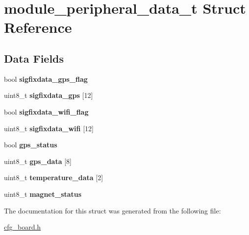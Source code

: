 \hypertarget{structmodule__peripheral__data__t}{}\section{module\+\_\+peripheral\+\_\+data\+\_\+t Struct Reference}
\label{structmodule__peripheral__data__t}
\subsection*{Data Fields}
\begin{DoxyCompactItemize}
\item 
\mbox{\label{structmodule__peripheral__data__t_a3425660ec4eae0d0f621812b5b8b065a}} 
bool {\bfseries sigfixdata\+\_\+gps\+\_\+flag}
\item 
\mbox{\label{structmodule__peripheral__data__t_a5dd41c3135b41097499085bfa013a365}} 
uint8\+\_\+t {\bfseries sigfixdata\+\_\+gps} \mbox{[}12\mbox{]}
\item 
\mbox{\label{structmodule__peripheral__data__t_a514358608c2643a4571ebd34dc815af7}} 
bool {\bfseries sigfixdata\+\_\+wifi\+\_\+flag}
\item 
\mbox{\label{structmodule__peripheral__data__t_a141f525edd62ed24b896899fc7cede75}} 
uint8\+\_\+t {\bfseries sigfixdata\+\_\+wifi} \mbox{[}12\mbox{]}
\item 
\mbox{\label{structmodule__peripheral__data__t_a00ec4412f388501d6f2e450c543758f5}} 
bool {\bfseries gps\+\_\+status}
\item 
\mbox{\label{structmodule__peripheral__data__t_a054359d88173d07a1ff2af5fe7bbda60}} 
uint8\+\_\+t {\bfseries gps\+\_\+data} \mbox{[}8\mbox{]}
\item 
\mbox{\label{structmodule__peripheral__data__t_a758a111e5668bd9125f515c133281af2}} 
uint8\+\_\+t {\bfseries temperature\+\_\+data} \mbox{[}2\mbox{]}
\item 
\mbox{\label{structmodule__peripheral__data__t_a6653b68abab6319750ac8d844273aad1}} 
uint8\+\_\+t {\bfseries magnet\+\_\+status}
\end{DoxyCompactItemize}


The documentation for this struct was generated from the following file\+:\begin{DoxyCompactItemize}
\item 
\hyperlink{cfg__board_8h}{cfg\+\_\+board.\+h}\end{DoxyCompactItemize}
